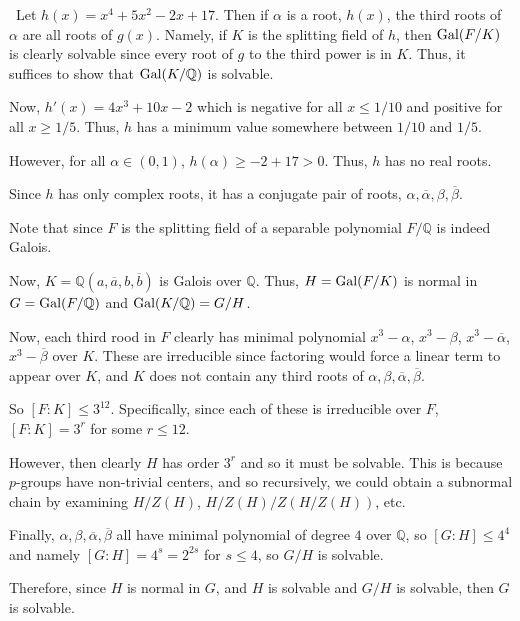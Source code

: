 \documentclass[12pt]{Qual}
\begin{document}
\begin{solution}$\,$
Let $h(x)=x^4+5x^2-2x+17$. Then if $\alpha$ is a root, $h(x)$, the third roots of $\alpha$ are all roots of $g(x).$ Namely, if $K$ is the splitting field of $h$, then $\text{Gal}(F/K)$ is clearly solvable since every root of $g$ to the third power is in $K$. Thus, it suffices to show that $\text{Gal}(K/\mathbb{Q})$ is solvable.

Now, $h'(x)=4x^3+10x-2$ which is negative for all $x\le 1/10$ and positive for all $x\ge1/5$. Thus, $h$ has a minimum value somewhere between $1/10$ and $1/5$.

However, for all $\alpha\in(0,1)$, $h(\alpha)\ge -2+17>0.$ Thus, $h$ has no real roots.

Since $h$ has only complex roots, it has a conjugate pair of roots, $\alpha,\overline{\alpha},\beta,\overline{\beta}.$

Note that since $F$ is the splitting field of a separable polynomial $F/\mathbb{Q}$ is indeed Galois.

Now, $K=\mathbb{Q}(a,\overline{a},b,\overline{b})$ is Galois over $\mathbb{Q}$. Thus, $H=\text{Gal}(F/K)$ is normal in $G=\text{Gal}(F/\mathbb{Q})$ and $\text{Gal}(K/\mathbb{Q})=G/H$.

Now, each third rood in $F$ clearly has minimal polynomial $x^3-\alpha$, $x^3-\beta$, $x^3-\overline{\alpha}$, $x^3-\overline{\beta}$ over $K$. These are irreducible since factoring would force a linear term to appear over $K$, and $K$ does not contain any third roots of $\alpha,\beta,\overline{\alpha},\overline{\beta}$.

So $[F:K]\le 3^{12}$. Specifically, since each of these is irreducible over $F$, $[F:K]=3^r$ for some $r\le12$.

However, then clearly $H$ has order $3^r$ and so it must be solvable. This is because $p$-groups have non-trivial centers, and so recursively, we could obtain a subnormal chain by examining $H/Z(H)$, $H/Z(H)/Z(H/Z(H))$, etc.

Finally, $\alpha,\beta,\overline{\alpha}, \overline{\beta}$ all have minimal polynomial of degree $4$ over $\mathbb{Q}$, so $[G:H]\le 4^4$ and namely $[G:H]=4^s=2^{2s}$ for $s\le 4$, so $G/H$ is solvable.

Therefore, since $H$ is normal in $G$, and $H$ is solvable and $G/H$ is solvable, then $G$ is solvable.

\end{solution}
\end{document}
